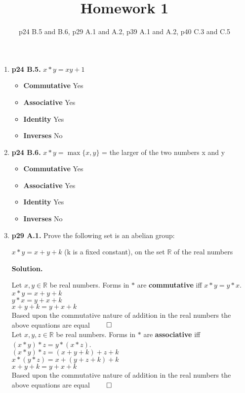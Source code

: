 \documentclass[11pt]{article}
\begin{document}
\title{Homework 1}
\date{p24 B.5 and B.6, p29 A.1 and A.2, p39 A.1 and A.2, p40 C.3 and C.5}
\maketitle

\thispagestyle{fancy}  
\pagestyle{fancy}      

\begin{enumerate}

\item {\bfseries p24 B.5.}
  $x*y = xy + 1$
  \begin{itemize}
  \item {\bfseries Commutative} Yes
  \item {\bfseries Associative} Yes
  \item {\bfseries Identity} Yes
  \item {\bfseries Inverses} No
  \end{itemize} 
 
\item {\bfseries p24 B.6.}
  $x*y = \max\{x,y\}$ = the larger of the two numbers x and y
  \begin{itemize}
  \item {\bfseries Commutative} Yes
  \item {\bfseries Associative} Yes
  \item {\bfseries Identity} Yes
  \item {\bfseries Inverses} No
  \end{itemize} 
 
\item {\bfseries p29 A.1.}
  Prove the following set is an abelian group:
  
  $x*y = x + y + k$ (k is a fixed constant), on the set $\mathbb{R}$ of the real numbers
  
  {\bfseries Solution.}
  
  Let $x, y \in \mathbb{R}$ be real numbers. Forms in $*$ are {\bfseries commutative} iff $x*y = y*x$. \\
  $x*y = x + y + k$ \\
  $y*x = y + x + k$ \\
  $x + y + k = y + x + k$ \\
  Based upon the commutative nature of addition in the real numbers the above equations are equal $\qed$\\
  
  Let $x, y, z \in \mathbb{R}$ be real numbers. Forms in $*$ are {\bfseries associative} iff $(x*y)*z = y*(x*z)$. \\
  $(x*y)*z = (x + y + k) + z + k$ \\
  $x*(y*z) = x + (y + z +k) + k$ \\
  $x + y + k = y + x + k$ \\
  Based upon the commutative nature of addition in the real numbers the above equations are equal $\qed$\\
   

\end{enumerate}
\end{document}
